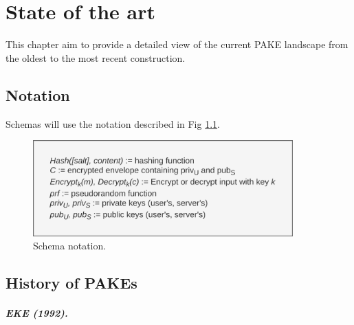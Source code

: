 \documentclass[../report.tex]{subfiles}
\begin{document}




\chapter{State of the art} \label{cha:state_of_the_art}

This chapter aim to provide a detailed view of the current PAKE landscape from the oldest to the most recent construction.

\section{Notation}

Schemas will use the notation described in Fig \ref{fig:notation}.

\begin{figure}[h]
 \centering
 \includegraphics[width=10cm]{notation.png}
 \caption{Schema notation.}
 \label{fig:notation}
\end{figure}



\section{History of PAKEs}

\paragraph{EKE (1992).}
\end{document}
